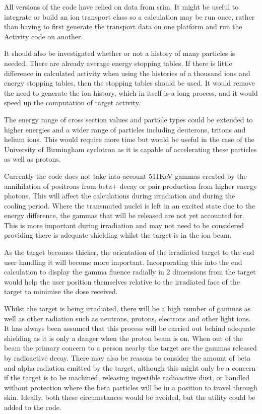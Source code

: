 All versions of the code have relied on data from \acrshort{srim}.  It might be useful to integrate or build an ion transport class so a calculation may be run once, rather than having to first generate the transport data on one platform and run the Activity code on another.  

It should also be investigated whether or not a history of many particles is needed.  There are already average energy stopping tables.  If there is little difference in calculated activity when using the histories of a thousand ions and energy stopping tables, then the stopping tables should be used.  It would remove the need to generate the ion history, which in itself is a long process, and it would speed up the computation of target activity.

The energy range of cross section values and particle types could be extended to higher energies and a wider range of particles including deuterons, tritons and helium ions.  This would require more time but would be useful in the case of the University of Birmingham cyclotron as it is capable of accelerating these particles as well as protons.

Currently the code does not take into account 511KeV gammas created by the annihilation of positrons from beta+ decay or pair production from higher energy photons.  This will affect the calculations during irradiation and during the cooling period.  Where the transmuted nuclei is left in an excited state due to the energy difference, the gammas that will be released are not yet accounted for.  This is more important during irradiation and may not need to be considered providing there is adequate shielding whilst the target is in the ion beam.

As the target becomes thicker, the orientation of the irradiated target to the end user handling it will become more important.  Incorporating this into the end calculation to display the gamma fluence radially in 2 dimensions from the target would help the user position themselves relative to the irradiated face of the target to minimise the dose received.

Whilst the target is being irradiated, there will be a high number of gammas as well as other radiation such as neutrons, protons, electrons and other light ions.  It has always been assumed that this process will be carried out behind adequate shielding as it is only a danger when the proton beam is on.  When out of the beam the primary concern to a person nearby the target are the gammas released by radioactive decay.  There may also be reasons to consider the amount of beta and alpha radiation emitted by the target, although this might only be a concern if the target is to be machined, releasing ingestible radioactive dust, or handled without protection where the beta particles will be in a position to travel through skin.  Ideally, both these circumstances would be avoided, but the utility could be added to the code.

